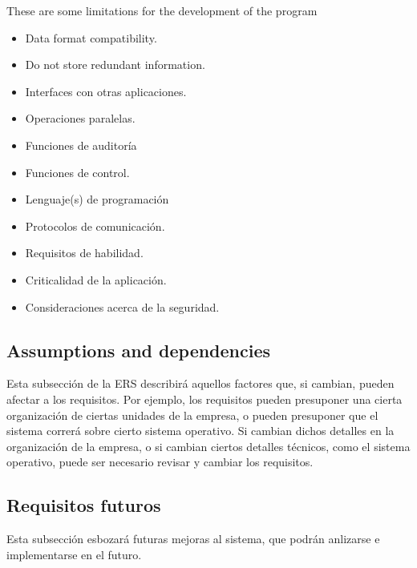 \documentclass[12pt,a4paper, twosite]{article}
\begin{document}
These are some limitations for the development of the program

\begin{itemize}
\item Data format compatibility.

\item Do not store redundant information.

\item Interfaces con otras aplicaciones.

\item Operaciones paralelas.

\item Funciones de auditoría

\item Funciones de control.

\item Lenguaje(s) de programación

\item Protocolos de comunicación.

\item Requisitos de habilidad.

\item Criticalidad de la aplicación.

\item Consideraciones acerca de la seguridad.
\end{itemize}


\subsection{Assumptions and dependencies}
\label{sec:org0ae23fe}

Esta subsección de la ERS describirá aquellos factores que, si
cambian, pueden afectar a los requisitos. Por ejemplo, los
requisitos pueden presuponer una cierta organización de ciertas
unidades de la empresa, o pueden presuponer que  el sistema correrá
sobre cierto sistema operativo. Si cambian dichos detalles en la
organización de la empresa, o si cambian ciertos detalles técnicos,
como el sistema operativo, puede ser necesario revisar y cambiar los
requisitos. 


\subsection{Requisitos futuros}
\label{sec:org33cfcdb}

Esta subsección esbozará futuras mejoras al sistema, que podrán
anlizarse e implementarse en el futuro.   
\end{document}
